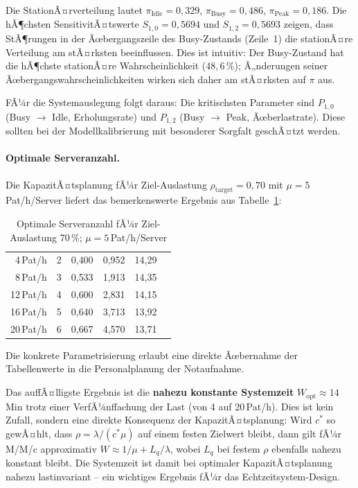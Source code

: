 ﻿\documentclass[a4paper,12pt]{report}
\theoremstyle{definition}
\begin{document}
Die StationÃ¤rverteilung lautet $\pi_\text{Idle} = 0{,}329$,
$\pi_\text{Busy} = 0{,}486$, $\pi_\text{Peak} = 0{,}186$.
Die hÃ¶chsten SensitivitÃ¤tswerte $S_{1,0} = 0{,}5694$ und
$S_{1,2} = 0{,}5693$ zeigen, dass StÃ¶rungen in der Ãœbergangszeile
des Busy-Zustands (Zeile~1) die stationÃ¤re Verteilung am stÃ¤rksten
beeinflussen. Dies ist intuitiv: Der Busy-Zustand hat die hÃ¶chste
stationÃ¤re Wahrscheinlichkeit ($48{,}6\,\%$); Ã„nderungen seiner
Ãœbergangswahrscheinlichkeiten wirken sich daher am stÃ¤rksten auf $\pi$ aus.

FÃ¼r die Systemauslegung folgt daraus: Die kritischsten Parameter sind
$P_{1,0}$ (Busy $\to$ Idle, Erholungsrate) und $P_{1,2}$
(Busy $\to$ Peak, Ãœberlastrate). Diese sollten bei der Modellkalibrierung
mit besonderer Sorgfalt geschÃ¤tzt werden.

\paragraph{Optimale Serveranzahl.}
Die KapazitÃ¤tsplanung fÃ¼r Ziel-Auslastung $\rho_\text{target} = 0{,}70$
mit $\mu = 5$\,Pat/h/Server liefert das bemerkenswerte Ergebnis aus
Tabelle~\ref{tab:kapazitaet}:

\begin{table}[H]
	\centering
	\begin{tabular}{@{}rrrrrr@{}}
		\toprule
		\boldmath{$\lambda$} & \boldmath{$c^*$} & \boldmath{$\rho_\text{opt}$} &
		\boldmath{$L_\text{opt}$} & \boldmath{$W_\text{opt}$\,(Min)} \\
		\midrule
		4\,Pat/h & 2 & 0{,}400 &  0{,}952 & 14{,}29 \\
		8\,Pat/h & 3 & 0{,}533 &  1{,}913 & 14{,}35 \\
		12\,Pat/h & 4 & 0{,}600 &  2{,}831 & 14{,}15 \\
		16\,Pat/h & 5 & 0{,}640 &  3{,}713 & 13{,}92 \\
		20\,Pat/h & 6 & 0{,}667 &  4{,}570 & 13{,}71 \\
		\bottomrule
	\end{tabular}
	\caption{Optimale Serveranzahl fÃ¼r Ziel-Auslastung 70\,\%; $\mu = 5$\,Pat/h/Server}
\label{tab:optimale-server-mu5}
	\label{tab:kapazitaet}
\end{table}

Die konkrete Parametrisierung erlaubt eine direkte Ãœbernahme der Tabellenwerte in die Personalplanung der Notaufnahme.

Das auffÃ¤lligste Ergebnis ist die \textbf{nahezu konstante Systemzeit}
$W_\text{opt} \approx 14$\,Min trotz einer VerfÃ¼nffachung der Last
(von 4 auf 20\,Pat/h). Dies ist kein Zufall, sondern eine direkte
Konsequenz der KapazitÃ¤tsplanung: Wird $c^*$ so gewÃ¤hlt, dass
$\rho = \lambda/(c^* \mu)$ auf einem festen Zielwert bleibt, dann
gilt fÃ¼r M/M/c approximativ $W \approx 1/\mu + L_q/\lambda$, wobei
$L_q$ bei festem $\rho$ ebenfalls nahezu konstant bleibt. Die Systemzeit
ist damit bei optimaler KapazitÃ¤tsplanung nahezu lastinvariant --
ein wichtiges Ergebnis fÃ¼r das Echtzeitsystem-Design.
\end{document}
